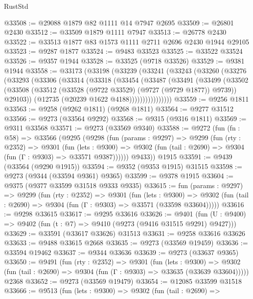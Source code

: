 \begin{lexlean}{RustStd}
\begin{coremodule}
{\begin{coremodule}
{{{{{{{{{{{{{{{{{{{{{{{{{{{{{{{{{{{{{{{{{{{{{{{{{{{{{{{@33508 := @29088 @1879 @82 @1111 @14 @7947 @2695
@33509 := @26801 @2430
@33512 := @33509 @1879 @1111 @7947
@33513 := @26778 @2430
@33522 := @33513 @1877 @83 @1573 @1111 @2711 @2696 @2430 @1944 @29105
@33523 := @9287 @1877
@33524 := @9483 @33523
@33525 := @33522 @33524
@33526 := @9357 @1944
@33528 := @33525 (@9718 @33526)
@33529 := @9381 @1944
@33558 := @33173
    (@33198
      (@33239
        (@33241
          (@33243
            (@33260
              (@33276
                (@33293
                  (@33306
                    (@33314
                      (@33318
                        (@33454
                          (@33487
                            (@33491
                              (@33499
                                (@33502
                                  (@33508
                                    (@33512 (@33528 (@9722 @33529) (@9727 (@9729 @1877)) @9739))
                                    @29103))
                                (@12735 (@20239 @1622 @4188))))))))))))))))
@33559 := @9256 @1811
@33563 := @9258 (@9262 @1811) (@9268 @1811)
@33564 := @9277 @31512
@33566 := @9273 (@33564 @9292)
@33568 := @9315 (@9316 @1811)
@33569 := @9311 @33568
@33571 := @9273 (@33569 @9340)
@33588 := @9272
    (fun (fn : @58) =>
    @33566
      (@9295
        (@9298
          (fun (params : @9297) =>
          @9299
            (fun (rty : @2352) =>
            @9301
              (fun (lets : @9300) =>
              @9302 (fun (tail : @2690) => @9304 (fun (Γ : @9303) => @33571 @9387))))))
        @9433))
    @1915
@33591 := @9439 (@33564 (@9290 @1915))
@33594 := @9352 (@9353 @1915) @31515
@33598 := @9273 (@9344 (@33594 @9361) @9365)
@33599 := @9378 @1915
@33604 := @9375 (@9377 @33599 @31518 @9333 @9335)
@33615 := fun (params : @9297) =>
  @9299
    (fun (rty : @2352) =>
    @9301
      (fun (lets : @9300) =>
      @9302 (fun (tail : @2690) => @9304 (fun (Γ : @9303) => @33571 (@33598 @33604)))))
@33616 := @9298 @33615
@33617 := @9295 @33616
@33626 := @9401
    (fun (U : @9400) => @9402 (fun (t : @7) => @9410 (@9273 (@9416 @31515 @9291) @9427)))
@33629 := @33591 (@33617 @33626) @31513
@33631 := @9258 @33616 @33626
@33633 := @9488 @33615 @2668
@33635 := @9273 (@33569 @19459)
@33636 := @33594 @19462
@33637 := @9344 @33636
@33639 := @9273 (@33637 @9365)
@33650 := @9491
    (fun (rty : @2352) =>
    @9301
      (fun (lets : @9300) =>
      @9302 (fun (tail : @2690) => @9304 (fun (Γ : @9303) => @33635 (@33639 @33604)))))
    @2368
@33652 := @9273 (@33569 @19479)
@33654 := @12085 @33599 @31518
@33666 := @9513
    (fun (lets : @9300) =>
    @9302
      (fun (tail : @2690) =>
}}}}}}}}}}}}}}}}}}}}}}}}}}}}}}}}}}}}}}}}}}}}}}}}}}}}}}}
\end{coremodule}}
\end{coremodule}
\end{lexlean}
